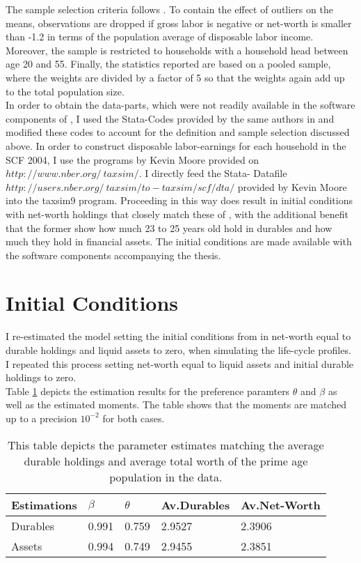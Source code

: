 \documentclass[a4paper,12pt,legno]{article}
\begin{document}
The sample selection criteria follows \cite{hintermaier2011}. To contain the effect of outliers on the means, observations are dropped if gross labor is negative or net-worth is smaller than -1.2 in terms of the population average of disposable labor income. Moreover, the sample is restricted to households with a household head between age 20 and 55. 
Finally, the statistics reported are based on a pooled sample, where the weights are divided by a factor of 5 so that the weights again add up to the total population size. \\
In order to obtain the data-parts, which were not readily available in the software components of \cite{hintermaier2011}, I used the Stata-Codes provided by the same authors in \cite{hintermaier2016} and modified these codes to account for the definition and sample selection discussed above. In order to construct disposable labor-earnings for each household in the SCF 2004, I use the programs by Kevin Moore provided on $http://www.nber.org/~taxsim/$.  I directly feed the Stata- Datafile $http://users.nber.org/~taxsim/to-taxsim/scf/dta/$ provided by Kevin Moore into the taxsim9 program. Proceeding in this way does result in initial conditions with net-worth holdings that closely match these of \cite{hintermaier2011}, with the additional benefit that the former show how much 23 to 25 years old hold in durables and how much they hold in financial assets. The initial conditions are made available with the software components accompanying the thesis.


\section{Initial Conditions}
\label{initial_conditions}

I re-estimated the model setting the initial conditions from \cite{hintermaier2011} in net-worth equal to durable holdings and liquid assets to zero, when simulating the life-cycle profiles. I repeated this process setting net-worth equal to liquid assets and initial durable holdings to zero.\\
Table \ref{estimates_initial_cond} depicts the estimation results for the preference paramters $\theta$ and $\beta$ as well as the estimated moments. The table shows that the moments are matched up to a precision $10^{-2}$ for both cases. 

\begin{table}[!htbp]
\centering
\caption{This table depicts the parameter estimates matching the average durable holdings and average total worth of the prime age population in the data.}
\label{estimates_initial_cond}
\begin{tabular}{llllll}
\hline
\multicolumn{2}{l}{Estimations} & $\beta$ & $\theta$ & Av.Durables & Av.Net-Worth\\ \hline
\multicolumn{2}{l}{Durables}             & 0.991    & 0.759  & 2.9527 & 2.3906      \\
\multicolumn{2}{l}{Assets}            & 0.994   & 0.749   & 2.9455 & 2.3851    
\end{tabular}
\end{table}
\end{document}
